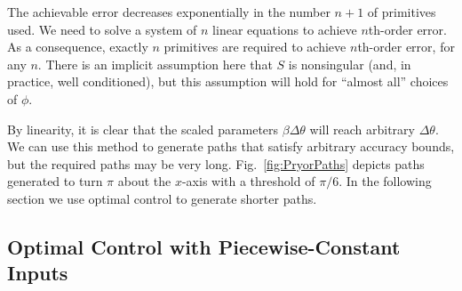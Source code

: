 \documentclass[letter paper, 10pt, conference]{ieeeconf}
\begin{document}
The achievable error decreases exponentially in the number $n+1$ of primitives used.
We need to solve a system of $n$ linear equations to achieve $n$th-order error.
As a consequence, exactly $n$ primitives are required to achieve $n$th-order error, for any $n$.
There is an implicit assumption here that  $S$ is nonsingular (and, in practice, well conditioned), but this assumption will hold for ``almost all'' choices of $\phi$.
       
By linearity, it is clear that the scaled parameters $\beta \Delta \theta$  will reach arbitrary $\Delta \theta$.
We can use this method to generate paths that satisfy arbitrary accuracy bounds, but the required paths may be very long.  
  Fig.~\ref{fig:PryorPaths} depicts paths generated to  turn $\pi$ about the $x$-axis with a threshold of $\pi/6$.
 In the following section we use optimal control to generate shorter paths.
  


\subsection{Optimal Control with Piecewise-Constant Inputs} \label{subsec:OptimalControl}%
\end{document}
